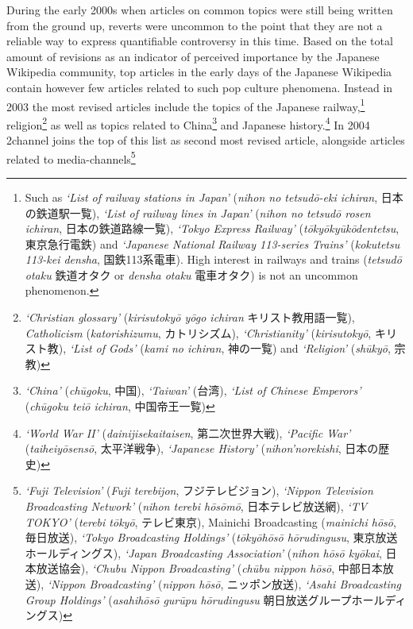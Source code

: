 \documentclass[10pt,british,A4paper,,openany]{memoir}
\begin{document}
During the early 2000s when articles on common topics were still being
written from the ground up, reverts were uncommon to the point that they
are not a reliable way to express quantifiable controversy in this time.
Based on the total amount of revisions as an indicator of perceived
importance by the Japanese Wikipedia community, top articles in the
early days of the Japanese Wikipedia contain however few articles
related to such pop culture phenomena. Instead in 2003 the most revised
articles include the topics of the Japanese railway,\footnote{Such as
  \emph{`List of railway stations in Japan'} (\emph{nihon no tetsudō-eki
  ichiran}, 日本の鉄道駅一覧), \emph{`List of railway lines in Japan'}
  (\emph{nihon no tetsudō rosen ichiran}, 日本の鉄道路線一覧),
  \emph{`Tokyo Express Railway'} (\emph{tōkyōkyūkōdentetsu},
  東京急行電鉄) and \emph{`Japanese National Railway 113-series Trains'}
  (\emph{kokutetsu 113-kei densha}, 国鉄113系電車). High interest in
  railways and trains (\emph{tetsudō otaku} 鉄道オタク or \emph{densha
  otaku} 電車オタク) is not an uncommon phenomenon.} religion\footnote{\emph{`Christian
  glossary'} (\emph{kirisutokyō yōgo ichiran} キリスト教用語一覧),
  \emph{Catholicism} (\emph{katorishizumu}, カトリシズム),
  \emph{`Christianity'} (\emph{kirisutokyō}, キリスト教), \emph{`List of
  Gods'} (\emph{kami no ichiran}, 神の一覧) and \emph{`Religion'}
  (\emph{shūkyō}, 宗教)} as well as topics related to China\footnote{\emph{`China'}
  (\emph{chūgoku}, 中国), \emph{`Taiwan'} (台湾), \emph{`List of Chinese
  Emperors' } (\emph{chūgoku teiō ichiran}, 中国帝王一覧)} and Japanese
history.\footnote{\emph{`World War II'} (\emph{dainijisekaitaisen},
  第二次世界大戦), \emph{`Pacific War'} (\emph{taiheiyōsensō},
  太平洋戦争), \emph{`Japanese History'} (\emph{nihon'norekishi},
  日本の歴史)} In 2004 2channel joins the top of this list as second
most revised article, alongside articles related to
media-channels\footnote{\emph{`Fuji Television'} (\emph{Fuji terebijon},
  フジテレビジョン), \emph{`Nippon Television Broadcasting Network'}
  (\emph{nihon terebi hōsōmō}, 日本テレビ放送網), \emph{`TV TOKYO'}
  (\emph{terebi tōkyō}, テレビ東京), Mainichi Broadcasting
  (\emph{mainichi hōsō}, 毎日放送), \emph{`Tokyo Broadcasting Holdings'}
  (\emph{tōkyōhōsō hōrudingusu}, 東京放送ホールディングス), \emph{`Japan
  Broadcasting Association'} (\emph{nihon hōsō kyōkai}, 日本放送協会),
  \emph{`Chubu Nippon Broadcasting'} (\emph{chūbu nippon hōsō},
  中部日本放送), \emph{`Nippon Broadcasting'} (\emph{nippon hōsō},
  ニッポン放送), \emph{`Asahi Broadcasting Group Holdings'}
  (\emph{asahihōsō gurūpu hōrudingusu} 朝日放送グループホールディングス)}
\end{document}
